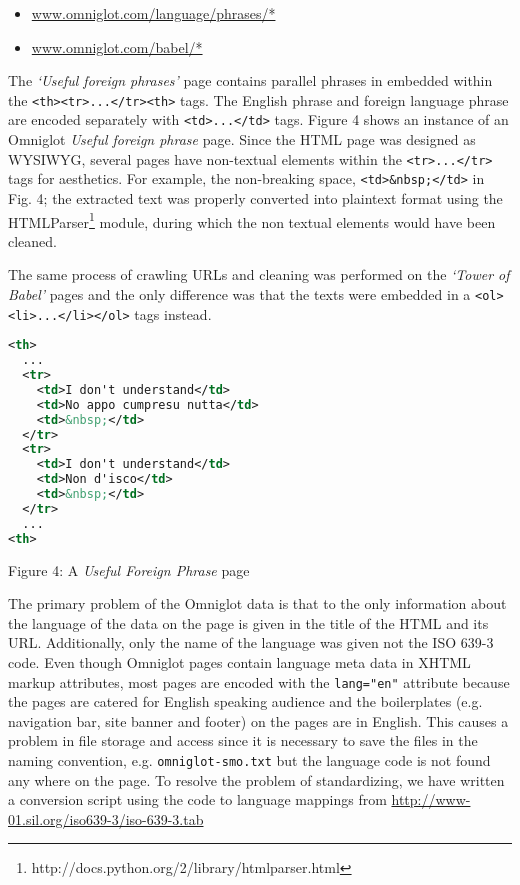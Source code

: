 \documentclass[11pt]{article}
\begin{document}
\begin{itemize}[noitemsep]
\item \url{www.omniglot.com/language/phrases/*} 
\item \url{www.omniglot.com/babel/*}
\end{itemize}

\noindent The \emph{`Useful foreign phrases'} page contains parallel phrases in embedded within the \texttt{<th><tr>...</tr><th>} tags. The English phrase and foreign language phrase are encoded separately with \texttt{<td>...</td>} tags. Figure 4 shows an instance of an Omniglot \emph{Useful foreign phrase} page. Since the HTML page was designed as WYSIWYG, several pages have non-textual elements within the \texttt{<tr>...</tr>} tags for aesthetics. For example, the non-breaking space, \texttt{<td>\&nbsp;</td>} in Fig. 4; the extracted text was properly converted into plaintext format using the HTMLParser\footnote{http://docs.python.org/2/library/htmlparser.html} module, during which the non textual elements would have been cleaned. 

The same process of crawling URLs and cleaning was performed on the \emph{`Tower of Babel'} pages and the only difference was that the texts were embedded in a \texttt{<ol><li>...</li></ol>} tags instead.

\begin{minipage}{\columnwidth}
\begin{lstlisting}[language=XML]
<th>
  ...
  <tr>
    <td>I don't understand</td>
    <td>No appo cumpresu nutta</td>
    <td>&nbsp;</td>
  </tr>
  <tr>
    <td>I don't understand</td>
    <td>Non d'isco</td>
    <td>&nbsp;</td>
  </tr>
  ...
<th>
\end{lstlisting} 
\centerline{Figure 4: A \emph{Useful Foreign Phrase} page}
\end{minipage}
\smallskip

\noindent The primary problem of the Omniglot data is that to the only information about the language of the data on the page is given in the title of the HTML and its URL. Additionally, only the name of the language was given not the ISO 639-3 code. Even though Omniglot pages contain language meta data in XHTML markup attributes, most pages are encoded with the \texttt{lang="en"} attribute because the pages are catered for English speaking audience and the boilerplates (e.g. navigation bar, site banner and footer) on the pages are in English. This causes a problem in file storage and access since it is necessary to save the files in the naming convention, e.g. \texttt{omniglot-smo.txt} but the language code is not found any where on the page. To resolve the problem of standardizing, we have written a conversion script using the code to language mappings from \url{http://www-01.sil.org/iso639-3/iso-639-3.tab}
\end{document}

